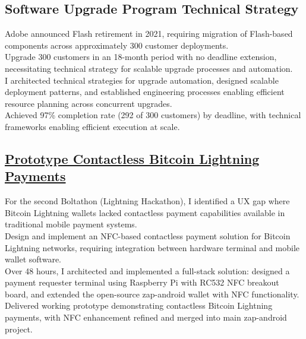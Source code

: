 \subsection{Software Upgrade Program Technical Strategy}
    Adobe announced Flash retirement in 2021, requiring migration of Flash-based components
    across approximately 300 customer deployments.\\
    Upgrade 300 customers in an 18-month period with no deadline extension, necessitating
    technical strategy for scalable upgrade processes and automation.\\
    I architected technical strategies for upgrade automation, designed scalable deployment
    patterns, and established engineering processes enabling efficient resource planning
    across concurrent upgrades.\\
    Achieved 97\% completion rate (292 of 300 customers) by deadline, with technical frameworks
    enabling efficient execution at scale.\\

\subsection{\href{https://github.com/runcrypto/static-discharge}
    {Prototype Contactless Bitcoin Lightning Payments}}
        For the second Boltathon (Lightning Hackathon), I identified a UX gap where Bitcoin
        Lightning wallets lacked contactless payment capabilities available in traditional
        mobile payment systems.\\
        Design and implement an NFC-based contactless payment solution for Bitcoin Lightning
        networks, requiring integration between hardware terminal and mobile wallet software.\\
        Over 48 hours, I architected and implemented a full-stack solution: designed a payment
        requester terminal using Raspberry Pi with RC532 NFC breakout board, and extended the
        open-source zap-android wallet with NFC functionality.\\
        Delivered working prototype demonstrating contactless Bitcoin Lightning payments, with
        NFC enhancement refined and merged into main zap-android project.\\

